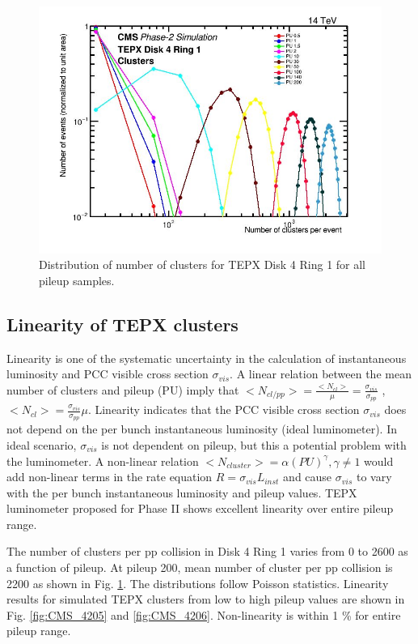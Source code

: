 \begin{figure}[H]
  \centering
  \includegraphics[width=0.7\columnwidth]{ashish_thesis/tepx_D4R!_clusters._allpu_1.png}
  \caption[D4R1 Clusters All Pileup]{Distribution of number of clusters for TEPX Disk 4 Ring 1 for all pileup samples.}
  \label{fig:tepx_cl_allPU}
\end{figure}

\subsection{Linearity of TEPX clusters}

Linearity is one of the systematic uncertainty in the calculation of instantaneous luminosity and PCC visible cross section $\sigma_{vis}$. A linear relation between the mean number of clusters and pileup (PU) imply that $<N_{cl/pp}> = \frac{<N_{cl}>}{\mu} = \frac{\sigma_{vis}}{\sigma_{pp}}$ , $<N_{cl}> =  \frac{\sigma_{vis}}{\sigma_{pp}} \mu $. Linearity indicates that the PCC visible cross section $\sigma_{vis}$ does not depend on the per bunch instantaneous luminosity (ideal luminometer). In ideal scenario, $\sigma_{vis}$ is not dependent on pileup, but this a potential problem with the luminometer. A non-linear relation $<N_{cluster}> = \alpha (PU)^{\gamma}, \gamma \neq 1$ would add non-linear terms in the rate equation $R = \sigma_{vis} L_{inst}$ and cause $\sigma_{vis}$ to vary with the per bunch instantaneous luminosity and pileup values. TEPX luminometer proposed for Phase II shows excellent linearity over entire pileup range.

The number of clusters per pp collision in Disk 4 Ring 1 varies from 0 to 2600 as a function of pileup. At pileup 200, mean number of cluster per pp collision is 2200 as shown in Fig. \ref{fig:tepx_cl_allPU}.
The distributions follow Poisson statistics. Linearity results for simulated TEPX clusters from low to high pileup values are shown in  Fig. \ref{fig:CMS_4205} and \ref{fig:CMS_4206}. Non-linearity is within 1 \% for entire pileup range.


